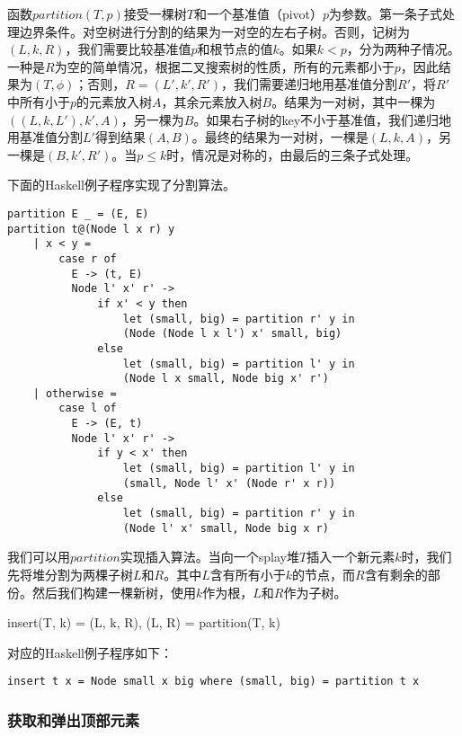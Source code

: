 \documentclass[UTF8]{article}
\begin{document}
函数$partition(T, p)$接受一棵树$T$和一个基准值（pivot）$p$为参数。第一条子式处理边界条件。对空树进行分割的结果为一对空的左右子树。否则，记树为$(L, k, R)$，我们需要比较基准值$p$和根节点的值$k$。如果$k < p$，分为两种子情况。一种是$R$为空的简单情况，根据二叉搜索树的性质，所有的元素都小于$p$，因此结果为$(T, \phi)$；否则，$R = (L', k', R')$，我们需要递归地用基准值分割$R'$，将$R'$中所有小于$p$的元素放入树$A$，其余元素放入树$B$。结果为一对树，其中一棵为$((L, k, L'), k', A)$，另一棵为$B$。如果右子树的key不小于基准值，我们递归地用基准值分割$L'$得到结果$(A, B)$。最终的结果为一对树，一棵是$(L, k, A)$，另一棵是$(B, k', R')$。当$p \leq k$时，情况是对称的，由最后的三条子式处理。

下面的Haskell例子程序实现了分割算法。

\begin{lstlisting}
partition E _ = (E, E)
partition t@(Node l x r) y
    | x < y =
        case r of
          E -> (t, E)
          Node l' x' r' ->
              if x' < y then
                  let (small, big) = partition r' y in
                  (Node (Node l x l') x' small, big)
              else
                  let (small, big) = partition l' y in
                  (Node l x small, Node big x' r')
    | otherwise =
        case l of
          E -> (E, t)
          Node l' x' r' ->
              if y < x' then
                  let (small, big) = partition l' y in
                  (small, Node l' x' (Node r' x r))
              else
                  let (small, big) = partition r' y in
                  (Node l' x' small, Node big x r)
\end{lstlisting}

我们可以用$partition$实现插入算法。当向一个splay堆$T$插入一个新元素$k$时，我们先将堆分割为两棵子树$L$和$R$。其中$L$含有所有小于$k$的节点，而$R$含有剩余的部份。然后我们构建一棵新树，使用$k$作为根，$L$和$R$作为子树。

\be
insert(T, k) = (L, k, R), (L, R) = partition(T, k)
\ee

对应的Haskell例子程序如下：

\lstset{language=Haskell}
\begin{lstlisting}
insert t x = Node small x big where (small, big) = partition t x
\end{lstlisting}

\subsubsection{获取和弹出顶部元素}
\end{document}
